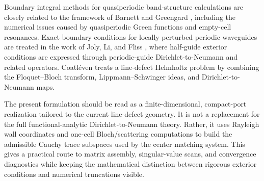 Boundary integral methods for quasiperiodic band-structure calculations are
closely related to the framework of Barnett and Greengard
\cite{BarnettGreengard2010}, including the numerical issues caused by
quasiperiodic Green functions and empty-cell resonances.  Exact boundary
conditions for locally perturbed periodic waveguides are treated in the work of
Joly, Li, and Fliss \cite{JolyLiFliss2006}, where half-guide exterior conditions
are expressed through periodic-guide Dirichlet-to-Neumann and related operators.
Coatl\'even \cite{Coatleven2012} treats a line-defect Helmholtz problem by
combining the Floquet--Bloch transform, Lippmann--Schwinger ideas, and
Dirichlet-to-Neumann maps.

The present formulation should be read as a finite-dimensional, compact-port
realization tailored to the current line-defect geometry.  It is not a
replacement for the full functional-analytic Dirichlet-to-Neumann theory.
Rather, it uses Rayleigh wall coordinates and one-cell Bloch/scattering
computations to build the admissible Cauchy trace subspaces used by the center
matching system.  This gives a practical route to matrix assembly, singular-value
scans, and convergence diagnostics while keeping the mathematical distinction
between rigorous exterior conditions and numerical truncations visible.
